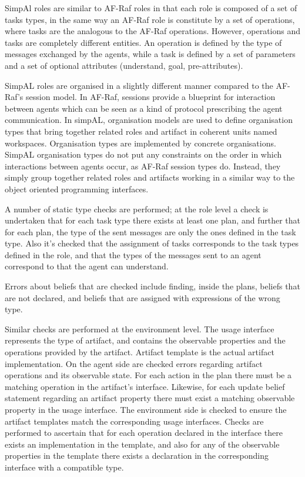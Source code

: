 \documentclass[a4paper,12pt,oneside,fleqn]{book} %
\begin{document}
{SimpAl roles are similar to AF-Raf roles in that each role is composed of a
set of tasks types, in the same way an AF-Raf role is constitute by a set
of operations, where tasks are the analogous to the AF-Raf operations.
However, operations and tasks are completely different entities. An
operation is defined by the type of messages exchanged by the agents, while
a task is defined by a set of parameters and a set of optional attributes
(understand, goal, pre-attributes).

SimpAL roles are organised in a slightly different manner compared to the
AF-Raf's session model. In AF-Raf, sessions provide a blueprint for
interaction between agents which can be seen as a kind of protocol
prescribing the agent communication. In simpAL, organisation models are used
to define organisation types that bring together related roles and
artifact in coherent units named workspaces. Organisation types are
implemented by concrete organisations. SimpAL organisation types do not put
any constraints on the order in which interactions between agents occur, as
AF-Raf session types do. Instead, they simply group together related roles
and artifacts working in a similar way to the object oriented programming
interfaces.

A number of static type checks are performed; at the role level a check is
undertaken that for each task type there exists at least one plan, and
further that for each plan, the type of the sent messages are only the ones
defined in the task type. Also it's checked that the assignment of tasks
corresponds to the task types defined in the role, and that the types of
the messages sent to an agent correspond to that the agent can understand.

Errors about beliefs that are checked include finding, inside the plans,
beliefs that are not declared, and beliefs that are assigned with
expressions of the wrong type.

Similar checks are performed at the environment level. The usage interface
represents the type of artifact, and contains the observable properties and
the operations provided by the artifact. Artifact template is the actual
artifact implementation. On the agent side are checked errors regarding
artifact operations and its observable state. For each action in the plan
there must be a matching operation in the artifact's interface.  Likewise,
for each update belief statement regarding an artifact property there must
exist a matching observable property in the usage interface. The
environment side is checked to ensure the artifact templates match the
corresponding usage interfaces. Checks are performed to ascertain
that for each operation declared in the interface there exists an
implementation in the template, and also for any of the observable properties
in the template there exists a declaration in the corresponding interface
with a compatible type.

}
\end{document}
